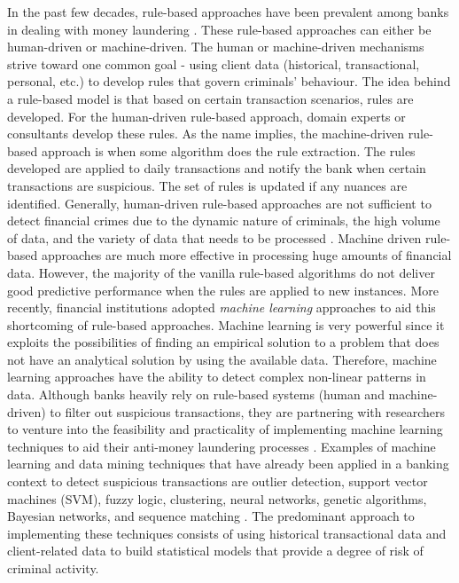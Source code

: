 In the past few decades, rule-based approaches have been prevalent among banks in dealing with money laundering \citep*{chen2018machine}. These rule-based approaches can either be human-driven or machine-driven. The human or machine-driven mechanisms strive toward one common goal - using client data (historical, transactional, personal, etc.) to develop rules that govern criminals' behaviour. The idea behind a rule-based model is that based on certain transaction scenarios, rules are developed. For the human-driven rule-based approach, domain experts or consultants develop these rules. As the name implies, the machine-driven rule-based approach is when some algorithm does the rule extraction. The rules developed are applied to daily transactions and notify the bank when certain transactions are suspicious. The set of rules is updated if any nuances are identified. Generally, human-driven rule-based approaches are not sufficient to detect financial crimes due to the dynamic nature of criminals, the high volume of data,  and the variety of data that needs to be processed \citep{chen2018machine}. Machine driven rule-based approaches are much more effective in processing huge amounts of financial data. However, the majority of the vanilla rule-based algorithms do not deliver good predictive performance when the rules are applied to new instances. More recently, financial institutions adopted \textit{machine learning} approaches to aid this shortcoming of rule-based approaches. Machine learning is very powerful since it exploits the possibilities of finding an empirical solution to a problem that does not have an analytical solution by using the available data. Therefore, machine learning approaches have the ability to detect complex non-linear patterns in data. Although banks heavily rely on rule-based systems (human and machine-driven) to filter out suspicious transactions, they are partnering with researchers to venture into the feasibility and practicality of implementing machine learning techniques to aid their anti-money laundering processes \citep{chen2018machine}. Examples of machine learning and data mining techniques that have already been applied in a banking context to detect suspicious transactions are outlier detection, support vector machines (SVM), fuzzy logic, clustering, neural networks, genetic algorithms, Bayesian networks, and sequence matching \citep*{al2021financial,abdallah2016fraud, ngai2011application, gao2007framework}. The predominant approach to implementing these techniques consists of using historical transactional data and client-related data to build statistical models that provide a degree of risk of criminal activity. 

